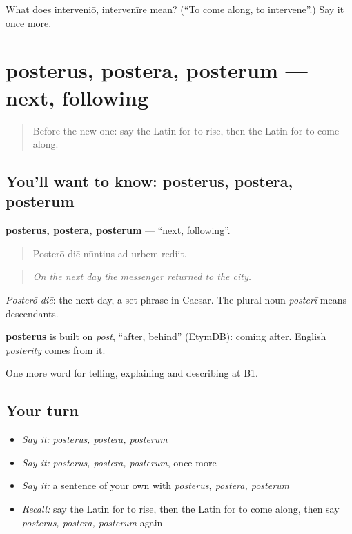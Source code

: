 \begin{tcolorbox}[breakable,colback=teal!4,colframe=teal!35!black,title={Before you move on}]
What does interveniō, intervenīre mean? (\textquotedblleft{}To come along, to intervene\textquotedblright{}.) Say it once more.
\end{tcolorbox}
\section[posterus, postera, posterum]{posterus, postera, posterum — next, following}

\label{lesson:LA-C298-posterus}



\begin{quote}
Before the new one: say the Latin for to rise, then the Latin for to come along.
\end{quote}

\subsection*{You'll want to know: posterus, postera, posterum}
\textbf{posterus, postera, posterum} — \textquotedblleft{}next, following\textquotedblright{}.

\begin{quote}
Posterō diē nūntius ad urbem rediit.
\end{quote}

\begin{quote}
\emph{On the next day the messenger returned to the city.}
\end{quote}

\emph{Posterō diē}: the next day, a set phrase in Caesar. The plural noun \emph{posterī} means descendants.

\begin{cousinweb}
\textbf{posterus} is built on \emph{post}, \textquotedblleft{}after, behind\textquotedblright{} (EtymDB): coming after. English \emph{posterity} comes from it.
\end{cousinweb}

\begin{grammarlens}[title={What you've built}]
One more word for telling, explaining and describing at B1.
\end{grammarlens}

\subsection*{Your turn}
\begin{itemize}
\raggedright
  \item \emph{Say it:} \emph{posterus, postera, posterum}
  \item \emph{Say it:} \emph{posterus, postera, posterum}, once more
  \item \emph{Say it:} a sentence of your own with \emph{posterus, postera, posterum}
  \item \emph{Recall:} say the Latin for to rise, then the Latin for to come along, then say \emph{posterus, postera, posterum} again
\end{itemize}

